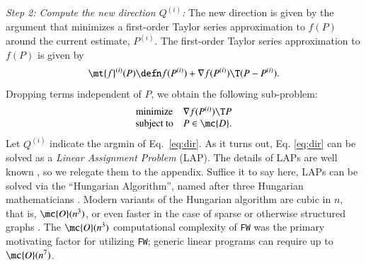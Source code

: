 \documentclass[preprint,11pt]{elsarticle}
\begin{document}
\emph{Step 2: Compute the new direction $Q^{(i)}$:} The new direction is given by the argument that minimizes a first-order Taylor series approximation to $f(P)$ around the current estimate, $P^{(i)}$. The first-order Taylor series approximation to $f(P)$ is given by
\begin{align}
	\mt{f}^{(i)}(P) \defn f(P^{(i)}) + \nabla f(P^{(i)})\T(P - P^{(i)}).
\end{align}
Dropping terms independent of $P$, we obtain the following sub-problem:
\begin{equation}
\begin{array}{cl}
			\text{minimize}   & \nabla f(P^{(i)})\T P \\
			\text{subject to}  &P \in \mc{D}.   
\end{array} \label{eq:dir}
\end{equation}
% 
% 
Let $Q^{(i)}$ indicate the argmin of Eq.~\eqref{eq:dir}.
As it turns out, Eq.  \eqref{eq:dir} can be solved as a \emph{Linear Assignment Problem} (LAP).  The details of LAPs are well known \cite{Burkard2009}, so we relegate them to the appendix.  Suffice it to say here, LAPs can be solved via  the ``Hungarian Algorithm'', named after three Hungarian mathematicians \cite{Kuhn1955, Konig1931, Egevary1931}.  Modern variants of the Hungarian algorithm are cubic in $n$, that is, $\mc{O}(n^3)$, or even faster in the case of sparse or otherwise structured graphs \cite{Jonker1987, Burkard2009}.  The $\mc{O}(n^3)$ computational complexity of \texttt{FW} was the primary motivating factor for utilizing \texttt{FW}; generic linear programs can require up to $\mc{O}(n^7)$.

\end{document}
